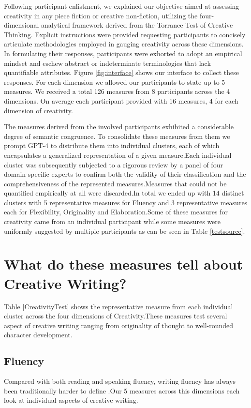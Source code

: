 Following participant enlistment, we explained our objective aimed at assessing creativity in any piece fiction or creative non-fiction, utilizing the four-dimensional analytical framework derived from the Torrance Test of Creative Thinking. Explicit instructions were provided requesting participants to concisely articulate methodologies employed in gauging creativity across these dimensions. In formulating their responses, participants were exhorted to adopt an empirical mindset and eschew abstract or indeterminate terminologies that lack quantifiable attributes. Figure \ref{fig:interface} shows our interface to collect these responses. For each dimension we allowed our participants to state up to 5 measures. We received a total 126 measures from 8 participants across the 4 dimensions. On average each participant provided with 16 measures, 4 for each dimension of creativity.

The measures derived from the involved participants exhibited a considerable degree of semantic congruence. To consolidate these measures from them we prompt GPT-4 \cite{OpenAI2023GPT4TR} to distribute them into individual clusters, each of which encapsulates a generalized representation of a given measure.Each individual cluster was subsequently subjected to a rigorous review by a panel of four domain-specific experts to confirm both the validity of their classification and the comprehensiveness of the represented measures.Measures that could not be quantified empirically at all were discarded.In total we ended up with 14 distinct clusters with 5 representative measures for Fluency and 3 representative measures each for Flexibility, Originality and Elaboration.Some of these measures for creativity came from an individual participant while some measures were uniformly suggested by multiple participants as can be seen in Table \ref{testsource}.

\section{What do these measures tell about Creative Writing?}
Table \ref{CreativityTest} shows the representative measure from each individual cluster across the four dimensions of Creativity.These measures test several aspect of creative writing ranging from originality of thought to well-rounded character development.
\subsection{Fluency}
Compared with both reading and speaking fluency, writing fluency has always been traditionally harder to define \cite{abdel2013we}.Our 5 measures across this dimensions each look at individual aspects of creative writing. 
